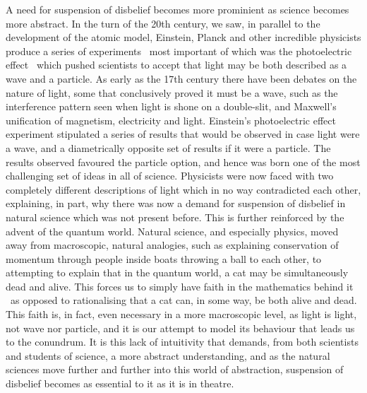 A need for suspension of disbelief becomes more prominient as science becomes more abstract. In the turn of the 20th century, we saw, in parallel to the development of the atomic model, Einstein, Planck and other incredible physicists produce a series of experiments \textendash\ most important of which was the photoelectric effect \textendash\ which pushed scientists to accept that light may be both described as a wave and a particle. As early as the 17th century there have been debates on the nature of light, some that conclusively proved it must be a wave, such as the interference pattern seen when light is shone on a double-slit, and Maxwell's unification of magnetism, electricity and light. Einstein's photoelectric effect experiment stipulated a series of results that would be observed in case light were a wave, and a diametrically opposite set of results if it were a particle. The results observed favoured the particle option, and hence was born one of the most challenging set of ideas in all of science. Physicists were now faced with two completely different descriptions of light which in no way contradicted each other, explaining, in part, why there was now a demand for suspension of disbelief in natural science which was not present before. This is further reinforced by the advent of the quantum world. Natural science, and especially physics, moved away from macroscopic, natural analogies, such as explaining conservation of momentum through people inside boats throwing a ball to each other, to attempting to explain that in the quantum world, a cat may be simultaneously dead and alive. This forces us to simply have faith in the mathematics behind it \textendash\ as opposed to rationalising that a cat can, in some way, be both alive and dead. This faith is, in fact, even necessary in a more macroscopic level, as light is light, not wave nor particle, and it is our attempt to model its behaviour that leads us to the conundrum. It is this lack of intuitivity that demands, from both scientists and students of science, a more abstract understanding, and as the natural sciences move further and further into this world of abstraction, suspension of disbelief becomes as essential to it as it is in theatre.

